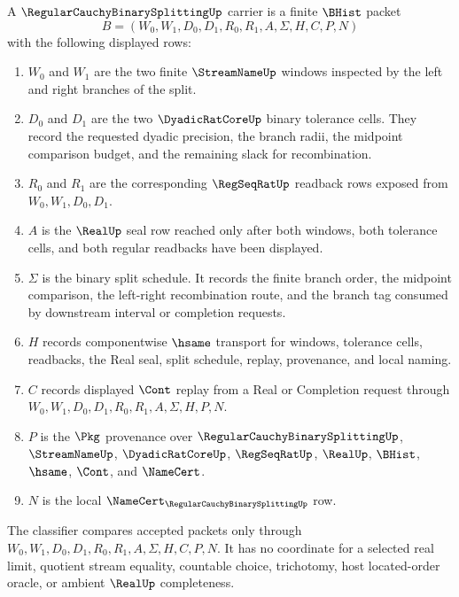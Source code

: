 \begin{definition}
\label{def:regular-cauchy-binary-splitting-carrier}
A $\RegularCauchyBinarySplittingUp$ carrier is a finite $\BHist$ packet
$$
B=(W_0,W_1,D_0,D_1,R_0,R_1,A,\Sigma,H,C,P,N)
$$
with the following displayed rows:
\begin{enumerate}
\item $W_0$ and $W_1$ are the two finite $\StreamNameUp$ windows inspected by the left and right branches of the split.
\item $D_0$ and $D_1$ are the two $\DyadicRatCoreUp$ binary tolerance cells. They record the requested dyadic precision, the branch radii, the midpoint comparison budget, and the remaining slack for recombination.
\item $R_0$ and $R_1$ are the corresponding $\RegSeqRatUp$ readback rows exposed from $W_0,W_1,D_0,D_1$.
\item $A$ is the $\RealUp$ seal row reached only after both windows, both tolerance cells, and both regular readbacks have been displayed.
\item $\Sigma$ is the binary split schedule. It records the finite branch order, the midpoint comparison, the left-right recombination route, and the branch tag consumed by downstream interval or completion requests.
\item $H$ records componentwise $\hsame$ transport for windows, tolerance cells, readbacks, the Real seal, split schedule, replay, provenance, and local naming.
\item $C$ records displayed $\Cont$ replay from a Real or Completion request through $W_0,W_1,D_0,D_1,R_0,R_1,A,\Sigma,H,P,N$.
\item $P$ is the $\Pkg$ provenance over $\RegularCauchyBinarySplittingUp$, $\StreamNameUp$, $\DyadicRatCoreUp$, $\RegSeqRatUp$, $\RealUp$, $\BHist$, $\hsame$, $\Cont$, and $\NameCert$.
\item $N$ is the local $\NameCert_{\RegularCauchyBinarySplittingUp}$ row.
\end{enumerate}
The classifier compares accepted packets only through $W_0,W_1,D_0,D_1,R_0,R_1,A,\Sigma,H,C,P,N$. It has no coordinate for a selected real limit, quotient stream equality, countable choice, trichotomy, host located-order oracle, or ambient $\RealUp$ completeness.
\end{definition}

